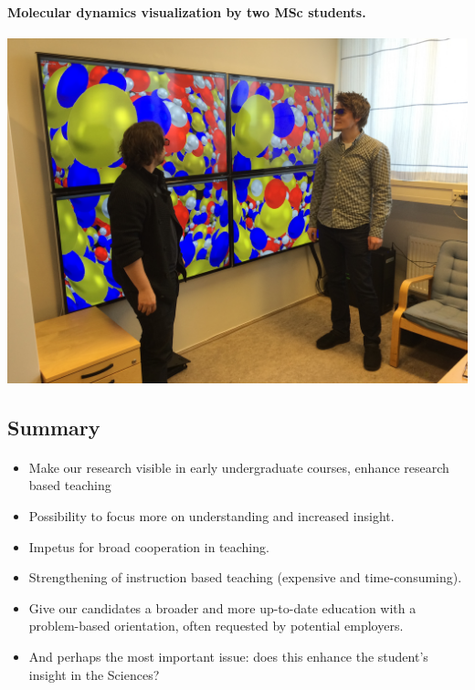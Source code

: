 \documentclass[%
twoside,                 %
final,                   %
10pt]{article}
\begin{document}
\paragraph{Molecular dynamics visualization by two MSc students.}


\centerline{\includegraphics[width=0.7\linewidth]{figures/visualize.jpg}}







\subsection*{Summary}

\paragraph{}

\begin{itemize}
\item Make our research visible in early undergraduate courses, enhance research based teaching

\item Possibility to focus more on understanding and increased insight.

\item Impetus for broad cooperation in teaching.

\item Strengthening of instruction based teaching (expensive and time-consuming).

\item Give our candidates a broader and more up-to-date education with a problem-based orientation, often requested by potential employers.

\item And perhaps the most important issue: does this enhance the student's insight in the Sciences?
\end{itemize}
\end{document}
